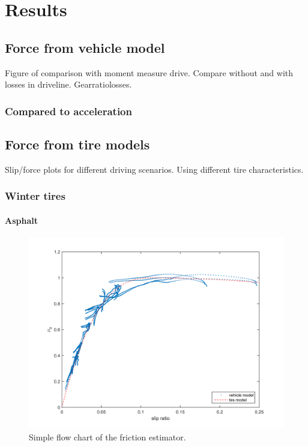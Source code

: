 \chapter{Results}



\section{Force from vehicle model}

Figure of comparison with moment measure drive. Compare without and with losses in driveline. Gearratiolosses.

\subsection{Compared to acceleration}



\section{Force from tire models}

Slip/force plots for different driving scenarios. Using different tire characteristics.

\subsection{Winter tires}

\subsubsection{Asphalt}

\begin{figure}[h]
	\centering
	\includegraphics[width=1.0\textwidth]{Pictures/slip_kraft_ljungby}
	\caption {Simple flow chart of the friction estimator.}
	\label{slip_kraft_ljungby}
\end{figure}

